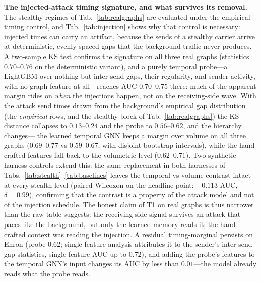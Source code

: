 \smallskip\noindent\textbf{The injected-attack timing signature, and what survives its removal.}
The stealthy regimes of Tab.~\ref{tab:realgraphs} are evaluated under the empirical-timing control, and
Tab.~\ref{tab:injection} shows why that control is necessary: injected times can carry an artifact, because
the sends of a stealthy carrier arrive at deterministic, evenly spaced gaps that the background traffic
never produces. A two-sample KS test confirms the signature on all three real graphs (statistics
$0.70$--$0.76$ on the deterministic variant), and a purely temporal probe---a LightGBM over nothing but
inter-send gaps, their regularity, and sender activity, with no graph feature at all---reaches AUC
$0.70$--$0.75$ there: much of the apparent margin rides on \emph{when} the injections
happen, not on the receiving-side wave. With the attack send times drawn from the background's empirical
gap distribution (the \emph{empirical} rows, and the stealthy block of Tab.~\ref{tab:realgraphs}) the
KS distance collapses to $0.13$--$0.24$ and the probe to $0.56$--$0.62$, and the hierarchy changes---
the learned temporal GNN keeps a margin over volume on all three graphs ($0.69$--$0.77$ vs
$0.59$--$0.67$, with disjoint bootstrap intervals), while the hand-crafted features fall back to the
volumetric level ($0.62$--$0.71$). Two synthetic-harness controls extend this: the same replacement in
both harnesses of Tabs.~\ref{tab:stealth}--\ref{tab:baselines} leaves the temporal-vs-volume contrast
intact at every stealth level (paired Wilcoxon on the headline point: $+0.113$ AUC, $\delta{=}0.99$),
confirming that the contrast is a property of the attack model and not of the injection schedule. The
honest claim of T1 on real graphs is thus narrower than the raw table suggests: the
receiving-side signal survives an attack that paces like the background, but only the learned memory
reads it; the hand-crafted context was reading the injection. A residual timing-marginal persists on
Enron (probe $0.62$; single-feature analysis attributes it to the sender's inter-send gap
statistics, single-feature AUC up to $0.72$), and adding the probe's features to the temporal GNN's
input changes its AUC by less than $0.01$---the model already reads what the probe reads.

